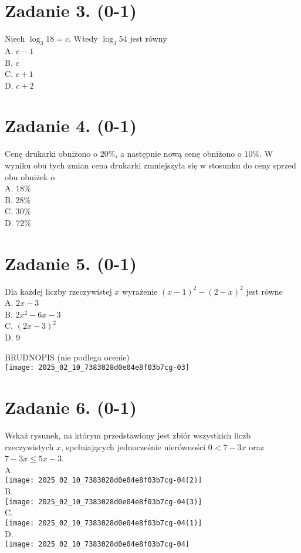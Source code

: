 \documentclass[10pt]{article}
\begin{document}
\section*{Zadanie 3. (0-1)}
Niech \(\log _{3} 18=c\). Wtedy \(\log _{3} 54\) jest równy\\
A. \(c-1\)\\
B. \(c\)\\
C. \(c+1\)\\
D. \(c+2\)

\section*{Zadanie 4. (0-1)}
Cenę drukarki obniżono o \(20 \%\), a następnie nową cenę obniżono o \(10 \%\). W wyniku obu tych zmian cena drukarki zmniejszyła się w stosunku do ceny sprzed obu obniżek o\\
A. \(18 \%\)\\
B. \(28 \%\)\\
C. \(30 \%\)\\
D. \(72 \%\)

\section*{Zadanie 5. (0-1)}
Dla każdej liczby rzeczywistej \(x\) wyrażenie \((x-1)^{2}-(2-x)^{2}\) jest równe\\
A. \(2 x-3\)\\
B. \(2 x^{2}-6 x-3\)\\
C. \((2 x-3)^{2}\)\\
D. 9

BRUDNOPIS (nie podlega ocenie)\\
\texttt{[image: 2025\_02\_10\_7383028d0e04e8f03b7cg-03]}

\section*{Zadanie 6. (0-1)}
Wskaż rysunek, na którym przedstawiony jest zbiór wszystkich liczb rzeczywistych \(x\), spełniających jednocześnie nierówności \(0<7-3 x\) oraz \(7-3 x \leq 5 x-3\).\\
A.\\
\texttt{[image: 2025\_02\_10\_7383028d0e04e8f03b7cg-04(2)]}\\
B.\\
\texttt{[image: 2025\_02\_10\_7383028d0e04e8f03b7cg-04(3)]}\\
C.\\
\texttt{[image: 2025\_02\_10\_7383028d0e04e8f03b7cg-04(1)]}\\
D.\\
\texttt{[image: 2025\_02\_10\_7383028d0e04e8f03b7cg-04]}
\end{document}
